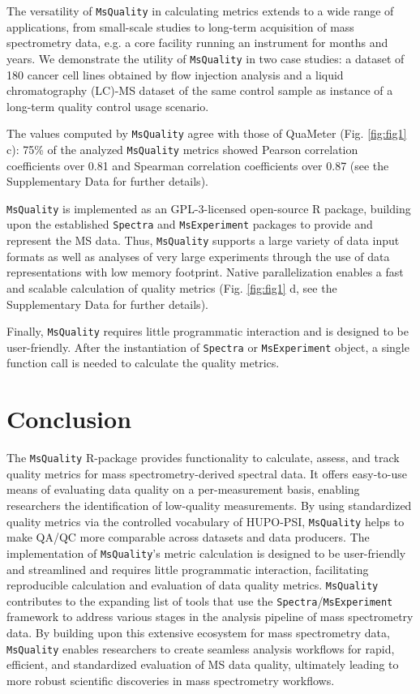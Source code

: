 \documentclass{bioinfo}
\begin{document}
The versatility of \texttt{MsQuality} in calculating metrics extends to a wide range of
applications, from small-scale studies to long-term acquisition of mass spectrometry
data, e.g. a core facility running an instrument for months and years. 
We demonstrate the utility of \texttt{MsQuality} in two case studies: a 
dataset of 180 cancer cell lines obtained by flow injection analysis
\citep{Cherkaoui2022} and a liquid chromatography (LC)-MS dataset of the same 
control sample \citep{Amidan2014} as instance of a long-term quality control 
usage scenario. \newpage

The values computed by \texttt{MsQuality}
agree with those of QuaMeter \citep{Ma2012} (Fig. \ref{fig:fig1} c): 
75\% of the analyzed \texttt{MsQuality} metrics showed Pearson correlation 
coefficients over 0.81 and Spearman correlation coefficients over 0.87
(see the Supplementary Data for further details).

\texttt{MsQuality} is implemented as an GPL-3-licensed open-source R package, 
building upon the established \texttt{Spectra} and \texttt{MsExperiment} packages
\citep{Rainer2022} to provide and represent the MS data. Thus, \texttt{MsQuality} 
supports a large variety of data input formats
as well as analyses of very large experiments through the use of data
representations with low memory footprint. Native parallelization enables a fast
and scalable calculation of quality metrics (Fig. \ref{fig:fig1} d, 
see the Supplementary Data for further details).

Finally, \texttt{MsQuality} requires little programmatic interaction and is designed to be
user-friendly.  After the instantiation of \texttt{Spectra} or \texttt{MsExperiment}
object, a single function call is needed to calculate the quality metrics.


\section{Conclusion}

The \texttt{MsQuality} R-package provides functionality to calculate, assess, 
and track quality metrics for mass spectrometry-derived spectral data. 
It offers easy-to-use means of evaluating data quality on a per-measurement 
basis, enabling researchers the identification of low-quality measurements.
By using standardized quality metrics via the controlled vocabulary of HUPO-PSI,
\texttt{MsQuality} helps to make QA/QC more comparable across datasets and 
data producers.
The implementation of \texttt{MsQuality}'s metric calculation is designed
to be user-friendly and streamlined and requires little programmatic 
interaction, facilitating reproducible calculation and evaluation of data 
quality metrics.
\texttt{MsQuality} contributes to the expanding list of 
tools that use the \texttt{Spectra}/\texttt{MsExperiment} framework 
\citep{Rainer2022} to address various stages in the analysis pipeline of 
mass spectrometry data. By building upon this extensive ecosystem for 
mass spectrometry data, 
\texttt{MsQuality} enables researchers to create seamless analysis workflows 
for rapid, efficient, and standardized evaluation of MS data quality, 
ultimately leading to more robust scientific discoveries in mass spectrometry
workflows.
\end{document}
